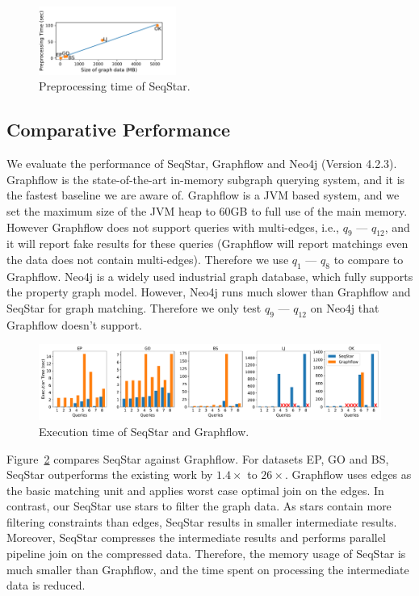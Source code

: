 \begin{figure}[ht]
  \centering
  \includegraphics[width=0.4\textwidth]{img/exp_preprocessing.pdf}
  \caption{Preprocessing time of SeqStar.}\label{img:exp_preprocessing}
\end{figure}
\subsection{Comparative Performance}\label{sec:experiments_compare}
We evaluate the performance of SeqStar, Graphflow and Neo4j (Version 4.2.3).
Graphflow is the state-of-the-art in-memory subgraph querying system,
and it is the fastest baseline we are aware of.
Graphflow is a JVM based system, and we set the maximum size of the JVM heap to 60GB to full use of the main memory.
However Graphflow does not support queries with multi-edges, i.e., $q_9$ --- $q_{12}$,
and it will report fake results for these queries (Graphflow will report matchings even the data does not contain multi-edges).
Therefore we use $q_1$ --- $q_8$ to compare to Graphflow.
Neo4j is a widely used industrial graph database, which fully supports the property graph model.
However, Neo4j runs much slower than Graphflow and SeqStar for graph matching.
Therefore we only test $q_9$ --- $q_{12}$  on Neo4j that Graphflow doesn't support.

\begin{figure}[ht]
  \centering
  \includegraphics[width=\textwidth]{img/exp_compare.pdf}
  \caption{Execution time of SeqStar and Graphflow.}\label{img:exp_compare}
\end{figure}

Figure~\ref{img:exp_compare} compares SeqStar against Graphflow.
For datasets EP, GO and BS, SeqStar outperforms the existing work by $1.4\times$ to $26\times$.
Graphflow uses edges as the basic matching unit and applies worst case optimal join on the edges.
In contrast, our SeqStar use stars to filter the graph data.
As stars contain more filtering constraints than edges, SeqStar results in smaller intermediate results.
Moreover, SeqStar compresses the intermediate results and performs parallel pipeline join on the compressed data.
Therefore, the memory usage of SeqStar is much smaller than Graphflow,
and the time spent on processing the intermediate data is reduced.

